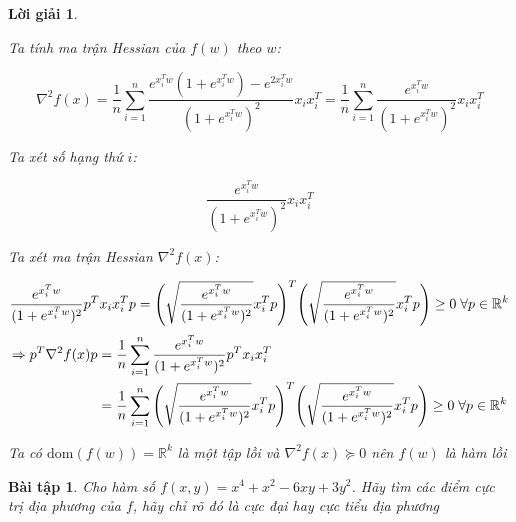 \documentclass[14pt, a4paper]{article}
\theoremstyle{sltheorem}
\newtheorem{baitap}{Bài tập}
\theoremstyle{soltheorem}
\newtheorem*{loigiai}{Lời giải}
\begin{document}
\begin{loigiai}
\begin{enumerate} [wide, labelwidth=!, labelindent=0pt,label=\textbf{\arabic*}.]
            Ta tính ma trận Hessian của $f(w)$ theo $w$:

            \begin{equation*}
                \nabla^2 f(x) = \dfrac{1}{n}\sum_{i=1}^n \dfrac{e^{x_i^Tw}(1 + e^{x_i^T w})-e^{2x_i^T w}}{(1 + e^{x_i^T w})^2}x_i x_i^T=\dfrac{1}{n}\sum_{i=1}^n \dfrac{e^{x_i^Tw}}{(1 + e^{x_i^T w})^2}x_i x_i^T
            \end{equation*}

            Ta xét số hạng thứ $i$:

            \begin{equation*}
                \dfrac{e^{x_i^Tw}}{(1 + e^{x_i^T w})^2}x_i x_i^T
            \end{equation*}

            Ta xét ma trận Hessian $\nabla^2 f(x)$:

            \begin{equation*}
                \dfrac{e^{x_i^Tw}}{(1 + e^{x_i^T w})^2}p^Tx_i x_i^T p=\Bigg(\sqrt{\dfrac{e^{x_i^Tw}}{(1 + e^{x_i^T w})^2}} x_i^Tp\Bigg)^T\Bigg(\sqrt{\dfrac{e^{x_i^Tw}}{(1 + e^{x_i^T w})^2}} x_i^Tp\Bigg)\geq 0 \thickspace \forall p \in \mathbb{R}^{k}
            \end{equation*}
            \begin{equation*}
                \begin{aligned}
                    \Rightarrow p^T \nabla^2 f(x)p&=\dfrac{1}{n}\sum_{i=1}^n \dfrac{e^{x_i^Tw}}{(1 + e^{x_i^T w})^2}p^Tx_i x_i^T\\
                    &=\dfrac{1}{n}\sum_{i=1}^n \Bigg(\sqrt{\dfrac{e^{x_i^Tw}}{(1 + e^{x_i^T w})^2}} x_i^Tp\Bigg)^T\Bigg(\sqrt{\dfrac{e^{x_i^Tw}}{(1 + e^{x_i^T w})^2}} x_i^Tp\Bigg)\geq 0 \thickspace \forall p \in \mathbb{R}^{k}
                \end{aligned}
            \end{equation*}

            Ta có $\mathrm{dom}(f(w))=\mathbb{R}^{k}$ là một tập lồi và $\nabla^2 f(x) \succeq 0$ nên $f(w)$ là hàm lồi
        \end{enumerate}
        

    \end{loigiai}

    \begin{baitap}
        Cho hàm số $f(x, y) = x^4 + x^2 - 6xy + 3y^2$. Hãy tìm các điểm cực trị địa phương của $f$, hãy chỉ rõ đó là cực đại hay cực tiểu địa phương
    \end{baitap}
\end{document}
